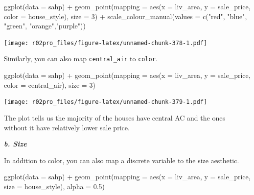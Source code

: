 \documentclass[
]{book}
\newenvironment{Shaded}{\begin{snugshade}}{\end{snugshade}}
\newcommand{\AttributeTok}[1]{\textcolor[rgb]{0.77,0.63,0.00}{#1}}
\newcommand{\DecValTok}[1]{\textcolor[rgb]{0.00,0.00,0.81}{#1}}
\newcommand{\FloatTok}[1]{\textcolor[rgb]{0.00,0.00,0.81}{#1}}
\newcommand{\FunctionTok}[1]{\textcolor[rgb]{0.00,0.00,0.00}{#1}}
\newcommand{\NormalTok}[1]{#1}
\newcommand{\SpecialCharTok}[1]{\textcolor[rgb]{0.00,0.00,0.00}{#1}}
\newcommand{\StringTok}[1]{\textcolor[rgb]{0.31,0.60,0.02}{#1}}
\begin{document}
\begin{Shaded}
\begin{Highlighting}[]
\FunctionTok{ggplot}\NormalTok{(}\AttributeTok{data =}\NormalTok{ sahp) }\SpecialCharTok{+} \FunctionTok{geom\_point}\NormalTok{(}\AttributeTok{mapping =} \FunctionTok{aes}\NormalTok{(}\AttributeTok{x =}\NormalTok{ liv\_area, }\AttributeTok{y =}\NormalTok{ sale\_price, }\AttributeTok{color =}\NormalTok{ house\_style), }\AttributeTok{size =} \DecValTok{3}\NormalTok{) }\SpecialCharTok{+}  \FunctionTok{scale\_colour\_manual}\NormalTok{(}\AttributeTok{values =} \FunctionTok{c}\NormalTok{(}\StringTok{"red"}\NormalTok{, }\StringTok{"blue"}\NormalTok{, }\StringTok{"green"}\NormalTok{, }\StringTok{"orange"}\NormalTok{,}\StringTok{"purple"}\NormalTok{))}
\end{Highlighting}
\end{Shaded}

\texttt{[image: r02pro\_files/figure-latex/unnamed-chunk-378-1.pdf]}

Similarly, you can also map \texttt{central\_air} to \texttt{color}.

\begin{Shaded}
\begin{Highlighting}[]
\FunctionTok{ggplot}\NormalTok{(}\AttributeTok{data =}\NormalTok{ sahp) }\SpecialCharTok{+} \FunctionTok{geom\_point}\NormalTok{(}\AttributeTok{mapping =} \FunctionTok{aes}\NormalTok{(}\AttributeTok{x =}\NormalTok{ liv\_area, }\AttributeTok{y =}\NormalTok{ sale\_price, }\AttributeTok{color =}\NormalTok{ central\_air), }\AttributeTok{size =} \DecValTok{3}\NormalTok{)}
\end{Highlighting}
\end{Shaded}

\texttt{[image: r02pro\_files/figure-latex/unnamed-chunk-379-1.pdf]}

The plot tells us the majority of the houses have central AC and the ones without it have relatively lower sale price.

\textbf{\emph{b. Size}}

In addition to color, you can also map a discrete variable to the size aesthetic.

\begin{Shaded}
\begin{Highlighting}[]
\FunctionTok{ggplot}\NormalTok{(}\AttributeTok{data =}\NormalTok{ sahp) }\SpecialCharTok{+} \FunctionTok{geom\_point}\NormalTok{(}\AttributeTok{mapping =} \FunctionTok{aes}\NormalTok{(}\AttributeTok{x =}\NormalTok{ liv\_area, }\AttributeTok{y =}\NormalTok{ sale\_price, }\AttributeTok{size =}\NormalTok{ house\_style), }\AttributeTok{alpha =} \FloatTok{0.5}\NormalTok{)}
\end{Highlighting}
\end{Shaded}
\end{document}
